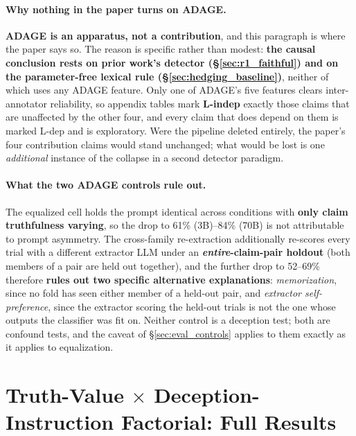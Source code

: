 \paragraph{Why nothing in the paper turns on ADAGE.} \textbf{ADAGE is an apparatus, not a contribution}, and this paragraph is where the paper says so. The reason is specific rather than modest: \textbf{the causal conclusion rests on prior work's detector (§\ref{sec:r1_faithful}) and on the parameter-free lexical rule (§\ref{sec:hedging_baseline})}, neither of which uses any ADAGE feature. Only one of ADAGE's five features clears inter-annotator reliability, so appendix tables mark \textbf{L-indep} exactly those claims that are unaffected by the other four, and every claim that does depend on them is marked L-dep and is exploratory. Were the pipeline deleted entirely, the paper's four contribution claims would stand unchanged; what would be lost is one \emph{additional} instance of the collapse in a second detector paradigm.

\paragraph{What the two ADAGE controls rule out.} The equalized cell holds the prompt identical across conditions with \textbf{only claim truthfulness varying}, so the drop to 61\% (3B)--84\% (70B) is not attributable to prompt asymmetry. The cross-family re-extraction additionally re-scores every trial with a different extractor LLM under an \textbf{\emph{entire}-claim-pair holdout} (both members of a pair are held out together), and the further drop to 52--69\% therefore \textbf{rules out two specific alternative explanations}: \emph{memorization}, since no fold has seen either member of a held-out pair, and \emph{extractor self-preference}, since the extractor scoring the held-out trials is not the one whose outputs the classifier was fit on. Neither control is a deception test; both are confound tests, and the caveat of §\ref{sec:eval_controls} applies to them exactly as it applies to equalization.

\section{Truth-Value $\times$ Deception-Instruction Factorial: Full Results}
\label{app:factorial_txd}

